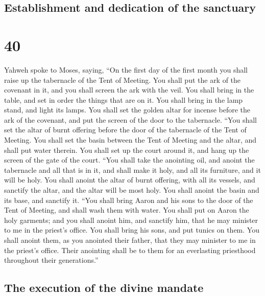 \begin{paracol}{2}
\begin{otherlanguage}{english}
\hypertarget{establishment-and-dedication-of-the-sanctuary}{%
\subsection{Establishment and dedication of the
sanctuary}\label{establishment-and-dedication-of-the-sanctuary}}

\hypertarget{section-79}{%
\section{40}\label{section-79}}

 Yahweh spoke to Moses, saying,  ``On the
first day of the first month you shall raise up the tabernacle of the
Tent of Meeting.  You shall put the ark of the covenant in
it, and you shall screen the ark with the veil.  You shall
bring in the table, and set in order the things that are on it. You
shall bring in the lamp stand, and light its lamps.  You
shall set the golden altar for incense before the ark of the covenant,
and put the screen of the door to the tabernacle.  ``You
shall set the altar of burnt offering before the door of the tabernacle
of the Tent of Meeting.  You shall set the basin between
the Tent of Meeting and the altar, and shall put water therein.
 You shall set up the court around it, and hang up the
screen of the gate of the court.  ``You shall take the
anointing oil, and anoint the tabernacle and all that is in it, and
shall make it holy, and all its furniture, and it will be holy.
 You shall anoint the altar of burnt offering, with all
its vessels, and sanctify the altar, and the altar will be most holy.
 You shall anoint the basin and its base, and sanctify
it.  ``You shall bring Aaron and his sons to the door of
the Tent of Meeting, and shall wash them with water.  You
shall put on Aaron the holy garments; and you shall anoint him, and
sanctify him, that he may minister to me in the priest's office.
 You shall bring his sons, and put tunics on them.
 You shall anoint them, as you anointed their father,
that they may minister to me in the priest's office. Their anointing
shall be to them for an everlasting priesthood throughout their
generations.''

\hypertarget{the-execution-of-the-divine-mandate}{%
\subsection{The execution of the divine
mandate}\label{the-execution-of-the-divine-mandate}}


\end{otherlanguage}
\end{paracol}
